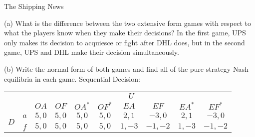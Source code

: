 \documentclass[10pt]{extarticle}
\begin{document}
\begin{problem}{The Shipping News}
\begin{center}
    \end{center}
    \tcblower
    \begin{problem}{(a)}
      What is the difference between the two extensive form games with respect to what the players know when they make their decisions?
      \tcblower
      In the first game, UPS only makes its decision to acquiesce or fight after DHL does, but in the second game, UPS and DHL make their decision simultaneously.
    \end{problem}
    \begin{problem}{(b)}
      Write the normal form of both games and find all of the pure strategy Nash equilibria in each game.
      \tcblower
      Sequential Decision:
      \begin{center}
        \small
        \begin{tabular}{cc|c|c|c|c|c|c|c|c|}
          \multicolumn{2}{c}{} & \multicolumn{8}{c}{$U$}\\
          \multicolumn{2}{c}{} & \multicolumn{1}{c}{$OA$}& \multicolumn{1}{c}{$OF$}& \multicolumn{1}{c}{$OA^*$}& \multicolumn{1}{c}{$OF^*$}& \multicolumn{1}{c}{$EA$}& \multicolumn{1}{c}{$EF$}& \multicolumn{1}{c}{$EA^*$}& \multicolumn{1}{c}{$EF^*$}\\
          \cline{3-10}
          \multirow{2}{*}{$D$} & $a$ & $5,0$& $5,0$& $5,0$& $5,0$ & $2,1$ & $-3,0$ & $2,1$ & $-3,0$\\
          \cline{3-10}
                               & $f$ & $5,0$& $5,0$& $5,0$& $5,0$ & $1,-3$ & $-1,-2$ & $1,-3$ & $-1,-2$\\
                               \cline{3-10}
        \end{tabular}

\end{center}
\end{problem}
\end{problem}
\end{document}
